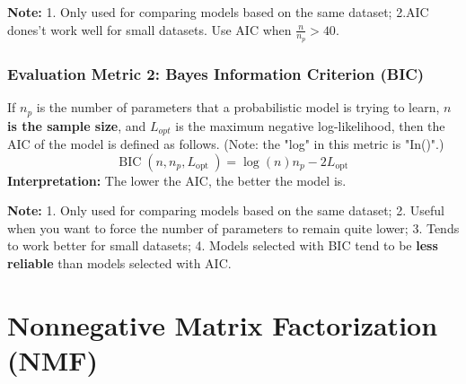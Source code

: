 \documentclass[11pt]{elegantbook}
\begin{document}
\textbf{Note:} 1. Only used for comparing models based on the same dataset; 2.AIC dones't work well for small datasets. Use AIC when $\frac{n}{n_p}>40$.

\subsection{Evaluation Metric 2: Bayes Information Criterion (BIC)}
If $n_p$ is the number of parameters that a probabilistic model is trying to learn, \textbf{$n$ is the sample size}, and $L_{opt}$ is the maximum negative log-likelihood, then the AIC of the model is defined as follows. (Note: the "log" in this metric is "In()".)
$$
\operatorname{BIC}\left(n, n_p, L_{\text {opt }}\right)=\log (n) n_p-2 L_{\text {opt }}
$$
\textbf{Interpretation:} The lower the AIC, the better the model is.

\textbf{Note:} 1. Only used for comparing models based on the same dataset; 2. Useful when you want to force the number of parameters to remain quite lower; 3. Tends to work better for small datasets; 4. Models selected with BIC tend to be \textbf{less reliable} than models selected with AIC.

\chapter{Nonnegative Matrix Factorization (NMF)}
\end{document}
